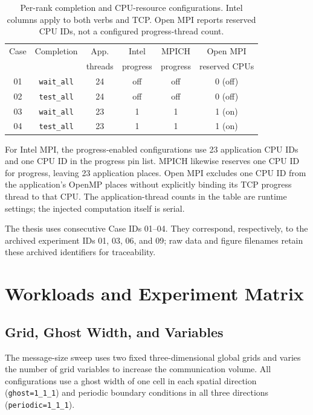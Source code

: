 \begin{table}[htb]
	\centering
	\small
	\setlength{\tabcolsep}{4pt}
	\caption{Per-rank completion and CPU-resource configurations. Intel columns
    apply to both verbs and TCP. Open MPI reports reserved CPU IDs, not a
    configured progress-thread count.}
	\label{tab:progress-case-matrix}
	\begin{tabular}{cccccc}
		\toprule
		Case & Completion & App. & Intel & MPICH & Open MPI \\
        & & threads & progress & progress & reserved CPUs \\
		\midrule
        01 & \texttt{wait\_all} & 24 & off & off & 0 (off) \\
        02 & \texttt{test\_all} & 24 & off & off & 0 (off) \\
        03 & \texttt{wait\_all} & 23 & 1 & 1 & 1 (on) \\
        04 & \texttt{test\_all} & 23 & 1 & 1 & 1 (on) \\
		\bottomrule
	\end{tabular}
\end{table}

For Intel MPI, the progress-enabled configurations use 23 application CPU
IDs and one CPU ID in the progress pin list. MPICH likewise reserves one
CPU ID for progress, leaving 23 application places. Open MPI excludes one
CPU ID from the application's OpenMP places without explicitly binding its
TCP progress thread to that CPU. The application-thread counts in the table
are runtime settings; the injected computation itself is serial.

The thesis uses consecutive Case IDs 01--04. They correspond, respectively,
to the archived experiment IDs 01, 03, 06, and 09; raw data and figure
filenames retain these archived identifiers for traceability.

\section{Workloads and Experiment Matrix}

\subsection{Grid, Ghost Width, and Variables}

The message-size sweep uses two fixed three-dimensional global grids and varies
the number of grid variables to increase the communication volume. All
configurations use a ghost width of one cell in each spatial direction
(\texttt{ghost=1\_1\_1}) and periodic boundary conditions in all three
directions (\texttt{periodic=1\_1\_1}).

